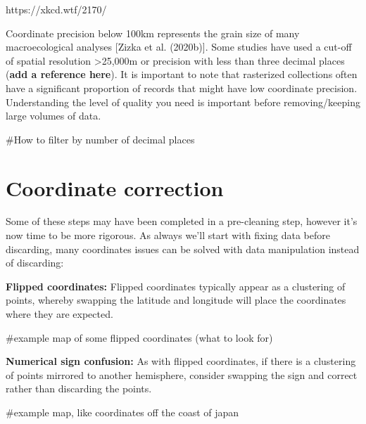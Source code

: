 \documentclass[
  letterpaper,
  DIV=11,
  numbers=noendperiod,
  oneside]{scrreprt}
\newenvironment{Shaded}{\begin{snugshade}}{\end{snugshade}}
\newcommand{\CommentTok}[1]{\textcolor[rgb]{0.37,0.37,0.37}{#1}}
\begin{document}
https://xkcd.wtf/2170/

Coordinate precision below 100km represents the grain size of many
macroecological analyses {[}Zizka et al. (2020b){]}. Some studies have
used a cut-off of spatial resolution \textgreater25,000m or precision
with less than three decimal places (\textbf{add a reference here}). It
is important to note that rasterized collections often have a
significant proportion of records that might have low coordinate
precision. Understanding the level of quality you need is important
before removing/keeping large volumes of data.

\begin{Shaded}
\begin{Highlighting}[]
\CommentTok{\#How to filter by number of decimal places}
\end{Highlighting}
\end{Shaded}

\hypertarget{coordinate-correction}{%
\section{Coordinate correction}\label{coordinate-correction}}

Some of these steps may have been completed in a pre-cleaning step,
however it's now time to be more rigorous. As always we'll start with
fixing data before discarding, many coordinates issues can be solved
with data manipulation instead of discarding:

\textbf{Flipped coordinates:} Flipped coordinates typically appear as a
clustering of points, whereby swapping the latitude and longitude will
place the coordinates where they are expected.

\begin{Shaded}
\begin{Highlighting}[]
\CommentTok{\#example map of some flipped coordinates (what to look for)}
\end{Highlighting}
\end{Shaded}

\textbf{Numerical sign confusion:} As with flipped coordinates, if there
is a clustering of points mirrored to another hemisphere, consider
swapping the sign and correct rather than discarding the points.

\begin{Shaded}
\begin{Highlighting}[]
\CommentTok{\#example map, like coordinates off the coast of japan}
\end{Highlighting}
\end{Shaded}
\end{document}
